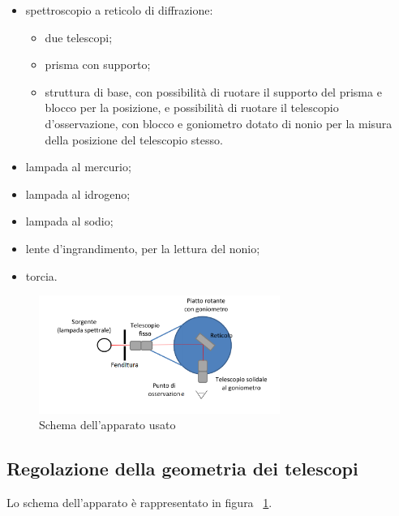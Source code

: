\documentclass[a4paper,10pt]{article}
\begin{document}
{{{{{{\begin{itemize}
	\item spettroscopio a reticolo di diffrazione:
	\begin{itemize}
		\item due telescopi;
		\item prisma con supporto;
		\item struttura di base, con possibilità di ruotare il supporto del prisma e blocco per la posizione, e possibilità di ruotare il telescopio d'osservazione, con blocco e goniometro dotato di nonio per la misura della posizione del telescopio stesso.
	\end{itemize}
	\item lampada al mercurio;
	\item lampada al idrogeno;
	\item lampada al sodio;
	\item lente d'ingrandimento, per la lettura del nonio;
	\item torcia.
\end{itemize}

\begin{figure}[H]
	\centering
	\includegraphics[width=0.7\textwidth]{../grafici/Schema2.png}
	\caption{Schema dell'apparato usato}
	\label{fig:schema2}
\end{figure}

\subsection{Regolazione della geometria dei telescopi}
Lo schema dell'apparato è rappresentato in figura \figurename{~\ref{fig:schema2}}.

}}}}}}
\end{document}
